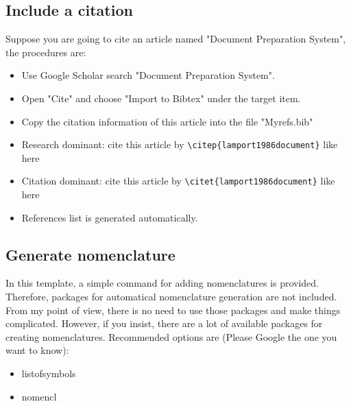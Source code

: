 \subsection{Include a citation} %
Suppose you are going to cite an article named "Document Preparation System", the procedures are:
\begin{itemize}
    \item Use Google Scholar search "Document Preparation System".
    \item Open "Cite" and choose "Import to Bibtex" under the target item.
    \item Copy the citation information of this article into the file "Myrefs.bib"
    \item Research dominant: cite this article by \verb+\citep{lamport1986document}+ like here \citep{lamport1986document}
    \item Citation dominant: cite this article by \verb+\citet{lamport1986document}+ like here \citet{lamport1986document}
    \item References list is generated automatically.
\end{itemize}
\subsection{Generate nomenclature} %
In this template, a simple command for adding nomenclatures is provided. Therefore, packages for automatical nomenclature generation are not included. From my point of view, there is no need to use those packages and make things complicated. However, if you insist, there are a lot of available packages for creating nomenclatures. Recommended options are (Please Google the one you want to know):
\begin{itemize}
    \item listofsymbols
    \item nomencl
\end{itemize}
